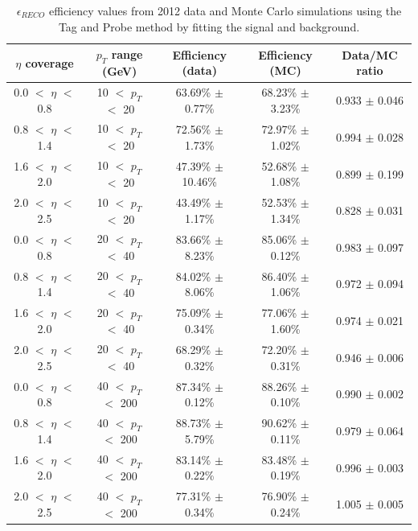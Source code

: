 \begin{table}[htb]
\caption{%
    $\epsilon_{RECO}$ efficiency values from 2012 data and Monte Carlo simulations using the Tag and Probe method by fitting the signal and background.
}
\begin{center}
\begin{tabular}{ | c | c | c | c | c |}
      \hline
      $\eta$ coverage & $p_T$ range (GeV) & Efficiency (data) & Efficiency (MC) & Data/MC ratio \\ \hline \hline
      0.0 $<$ $\eta$ $<$ 0.8 & 10 $<$ $p_T$ $<$ 20 & 63.69\% $\pm$ 0.77\% & 68.23\% $\pm$ 3.23\% & 0.933 $\pm$ 0.046 \\ \hline
      0.8 $<$ $\eta$ $<$ 1.4 & 10 $<$ $p_T$ $<$ 20 & 72.56\% $\pm$ 1.73\% & 72.97\% $\pm$ 1.02\% & 0.994 $\pm$ 0.028 \\ \hline
      1.6 $<$ $\eta$ $<$ 2.0 & 10 $<$ $p_T$ $<$ 20 & 47.39\% $\pm$ 10.46\% & 52.68\% $\pm$ 1.08\% & 0.899 $\pm$ 0.199 \\ \hline
      2.0 $<$ $\eta$ $<$ 2.5 & 10 $<$ $p_T$ $<$ 20 & 43.49\% $\pm$ 1.17\% & 52.53\% $\pm$ 1.34\% & 0.828 $\pm$ 0.031 \\ \hline
      \hline
      0.0 $<$ $\eta$ $<$ 0.8 & 20 $<$ $p_T$ $<$ 40 & 83.66\% $\pm$ 8.23\% & 85.06\% $\pm$ 0.12\% & 0.983 $\pm$ 0.097 \\ \hline
      0.8 $<$ $\eta$ $<$ 1.4 & 20 $<$ $p_T$ $<$ 40 & 84.02\% $\pm$ 8.06\% & 86.40\% $\pm$ 1.06\% & 0.972 $\pm$ 0.094 \\ \hline
      1.6 $<$ $\eta$ $<$ 2.0 & 20 $<$ $p_T$ $<$ 40 & 75.09\% $\pm$ 0.34\% & 77.06\% $\pm$ 1.60\% & 0.974 $\pm$ 0.021 \\ \hline
      2.0 $<$ $\eta$ $<$ 2.5 & 20 $<$ $p_T$ $<$ 40 & 68.29\% $\pm$ 0.32\% & 72.20\% $\pm$ 0.31\% & 0.946 $\pm$ 0.006 \\ \hline
      \hline
      0.0 $<$ $\eta$ $<$ 0.8 & 40 $<$ $p_T$ $<$ 200 & 87.34\% $\pm$ 0.12\% & 88.26\% $\pm$ 0.10\% & 0.990 $\pm$ 0.002 \\ \hline
      0.8 $<$ $\eta$ $<$ 1.4 & 40 $<$ $p_T$ $<$ 200 & 88.73\% $\pm$ 5.79\% & 90.62\% $\pm$ 0.11\% & 0.979 $\pm$ 0.064 \\ \hline
      1.6 $<$ $\eta$ $<$ 2.0 & 40 $<$ $p_T$ $<$ 200 & 83.14\% $\pm$ 0.22\% & 83.48\% $\pm$ 0.19\% & 0.996 $\pm$ 0.003 \\ \hline
      2.0 $<$ $\eta$ $<$ 2.5 & 40 $<$ $p_T$ $<$ 200 & 77.31\% $\pm$ 0.34\% & 76.90\% $\pm$ 0.24\% & 1.005 $\pm$ 0.005 \\ \hline
    \end{tabular}
\end{center}
\label{tab:tagandprobe_reco}
\end{table}


